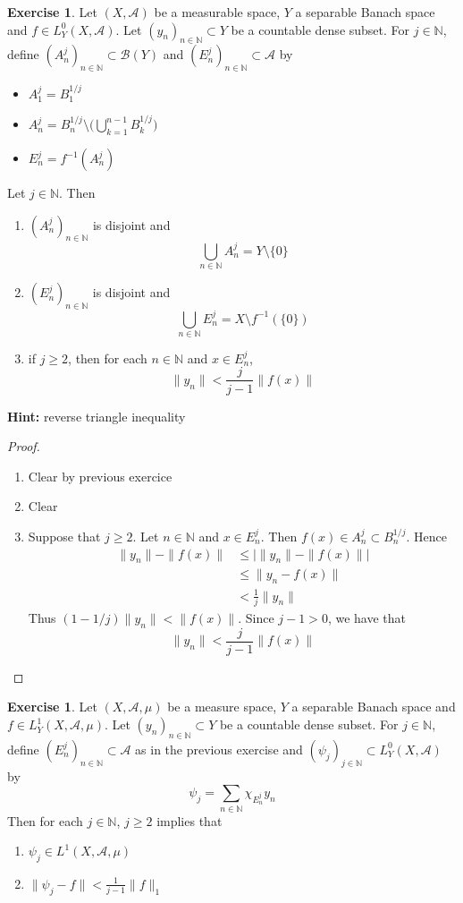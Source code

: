 \documentclass{book}
\theoremstyle{definition}
\newtheorem{ex}[definition]{Exercise}
\newcommand{\N}{\mathbb{N}}
\newcommand{\MA}{\mathcal{A}}
\newcommand{\MB}{\mathcal{B}}
\newcommand{\lex}[1]{\label{ex:#1}}
\DeclareMathOperator*{\0}{\mbf{0}}
\DeclareMathOperator*{\1}{\mbf{1}}
\begin{document}
	\begin{ex}
	Let $(X, \MA)$ be a measurable space, $Y$ a separable Banach space and $f \in L^0_Y(X, \MA)$.  Let $(y_n)_{n \in \N} \subset Y$ be a countable dense subset. For $j \in \N$, define $(A_n^j)_{n \in \N} \subset \MB(Y)$ and $(E_n^j)_{n \in \N} \subset \MA$ by  
	\begin{itemize}
			\item $A_1^j = B^{1/j}_1$ 
			\item $A_n^j = B^{1/j}_n  \setminus \bigg( \bigcup \limits_{k=1}^{n-1} B^{1/j}_k \bigg)$ 
			\item $E_n^j = f^{-1}(A^j_n)$ 
	\end{itemize}
	Let $j \in \N$. Then
	\begin{enumerate}
		\item $(A_n^j)_{n \in \N}$ is disjoint and $$\bigcup_{n \in \N}A_n^j = Y \setminus \{0\}$$
		\item $(E_n^j)_{n \in \N}$ is disjoint and $$\bigcup_{n \in \N}E_n^j = X \setminus f^{-1}(\{0\})$$
		\item if $j \geq 2$, then for each $n \in \N$ and $x \in E_n^j$, $$\|y_n\| < \frac{j}{j-1} \|f(x)\|$$
	\end{enumerate}
	\textbf{Hint:} reverse triangle inequality
	\end{ex}

	\begin{proof}\
		\begin{enumerate}
			\item Clear by previous exercice
			\item Clear
			\item Suppose that $j \geq 2$. Let $n \in \N$ and $x \in E_n^j$. Then $f(x) \in A_n^j \subset B_n^{1/j}$. Hence 
			\begin{align*}
				\|y_n\| - \|f(x)\|
				& \leq \bigg| \|y_n\| - \|f(x)\| \bigg| \\
				& \leq \|y_n - f(x)\| \\
				& < \frac{1}{j} \|y_n\|
			\end{align*}
			Thus $(1 - 1/j) \|y_n\| < \|f(x)\|$. Since $j-1 > 0$, we have that $$\|y_n\| < \frac{j}{j-1} \|f(x)\|$$
		\end{enumerate}
	\end{proof}
	
	\begin{ex} \lex{00000} 
	Let $(X, \MA, \mu)$ be a measure space, $Y$ a separable Banach space and $f \in L^1_Y(X, \MA, \mu)$. Let $(y_n)_{n \in \N} \subset Y$ be a countable dense subset. For $j \in \N$, define $(E_n^j)_{n \in \N} \subset \MA$ as in the previous exercise and $(\psi_j)_{j \in \N} \subset L^0_Y(X, \MA)$ by 
	$$\psi_j = \sum\limits_{n \in \N}\chi_{E_n^j}y_n$$  
	Then for each $j \in \N$, $j \geq 2$ implies that 
	\begin{enumerate}
		\item $\psi_j \in L^1(X, \MA, \mu)$ 
		\item $\|\psi_j - f\| < \frac{1}{j - 1} \|f\|_1$
	\end{enumerate}
	\end{ex}
	
\end{document}
